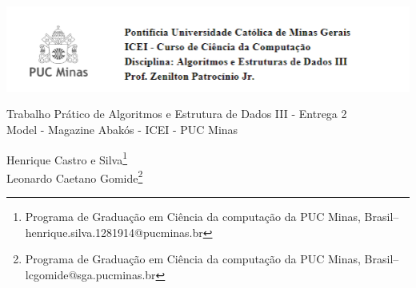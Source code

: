 \documentclass[a4paper,12pt,Times]{article}
\makeatletter
\newcommand{\monog}{Trabalho Prático de Algoritmos e Estrutura de Dados III - Entrega 2}
\newcommand{\monogES}{Model - Magazine Abakós - ICEI - PUC Minas}
\newcommand{\origem}{Brasil}
\newcommand{\AutorA}{Henrique Castro e Silva}
\newcommand{\funcaoA}{}
\newcommand{\emailA}{henrique.silva.1281914@pucminas.br}
\newcommand{\cursA}{Programa de Graduação em Ciência da computação da PUC Minas}
\newcommand{\AutorB}{Leonardo Caetano Gomide}
\newcommand{\funcaoB}{}
\newcommand{\emailB}{lcgomide@sga.pucminas.br}
\newcommand{\cursB}{Programa de Graduação em Ciência da computação da PUC Minas}
\makeatother
\begin{document}

\begin{flushleft}

\begin{minipage} [c][3cm][b]{15cm} %
\begin{flushleft}
\includegraphics[scale=1.5]{figuras/header.png} 
\end{flushleft}
\end{minipage}

 \vspace{0cm} {
 \singlespacing \Large{\monog \\ }
  \normalsize{\monogES}
 }
\end{flushleft}
\begin{flushright}
\singlespacing 
\normalsize{\AutorA \footnote{\funcaoA \cursA, \origem -- \emailA }} \\
\normalsize{\AutorB \footnote{\funcaoB \cursB, \origem -- \emailB }} \\
\end{flushright}
\thispagestyle{empty}
\end{document}
